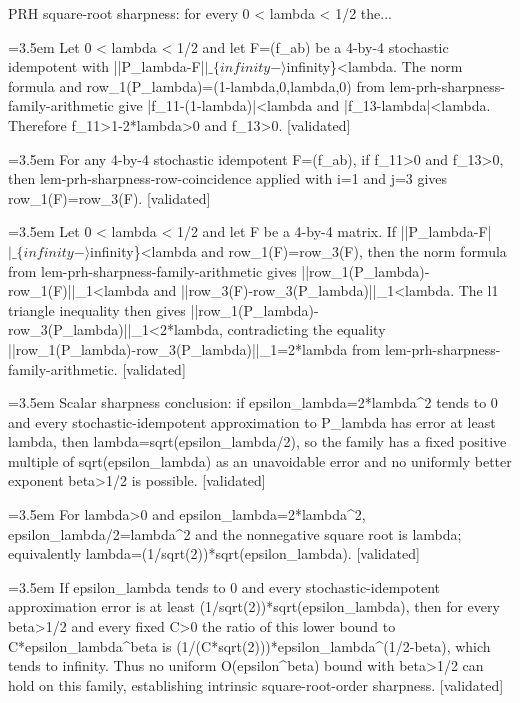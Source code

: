 \documentclass{article}
\newcommand{\step}[1]{\par\noindent\hangindent=3.5em\hangafter=1%
  \makebox[3.5em][l]{\textbf{#1.}}}
\newcommand{\steptag}[1]{\hfill{\small\textsf{[#1]}}}
\begin{document}
\begin{proofbox}{PRH square-root sharpness: for every 0 < lambda < 1/2 the...}
\step{1.2.1} Let 0 < lambda < 1/2 and let F=(f\_ab) be a 4-by-4 stochastic idempotent with ||P\_lambda-F|$|\_\{infinity-\rangle$infinity\}<lambda. The norm formula and row\_1(P\_lambda)=(1-lambda,0,lambda,0) from lem-prh-sharpness-family-arithmetic give |f\_11-(1-lambda)|<lambda and |f\_13-lambda|<lambda. Therefore f\_11>1-2*lambda>0 and f\_13>0. \steptag{validated} \\[4pt]
\step{1.2.2} For any 4-by-4 stochastic idempotent F=(f\_ab), if f\_11>0 and f\_13>0, then lem-prh-sharpness-row-coincidence applied with i=1 and j=3 gives row\_1(F)=row\_3(F). \steptag{validated} \\[4pt]
\step{1.2.3} Let 0 < lambda < 1/2 and let F be a 4-by-4 matrix. If ||P\_lambda-F|$|\_\{infinity-\rangle$infinity\}<lambda and row\_1(F)=row\_3(F), then the norm formula from lem-prh-sharpness-family-arithmetic gives ||row\_1(P\_lambda)-row\_1(F)||\_1<lambda and ||row\_3(F)-row\_3(P\_lambda)||\_1<lambda. The l1 triangle inequality then gives ||row\_1(P\_lambda)-row\_3(P\_lambda)||\_1<2*lambda, contradicting the equality ||row\_1(P\_lambda)-row\_3(P\_lambda)||\_1=2*lambda from lem-prh-sharpness-family-arithmetic. \steptag{validated} \\[4pt]
\step{1.3} Scalar sharpness conclusion: if epsilon\_lambda=2*lambda\textasciicircum{}2 tends to 0 and every stochastic-idempotent approximation to P\_lambda has error at least lambda, then lambda=sqrt(epsilon\_lambda/2), so the family has a fixed positive multiple of sqrt(epsilon\_lambda) as an unavoidable error and no uniformly better exponent beta>1/2 is possible. \steptag{validated} \\[6pt]
\step{1.3.1} For lambda>0 and epsilon\_lambda=2*lambda\textasciicircum{}2, epsilon\_lambda/2=lambda\textasciicircum{}2 and the nonnegative square root is lambda; equivalently lambda=(1/sqrt(2))*sqrt(epsilon\_lambda). \steptag{validated} \\[4pt]
\step{1.3.2} If epsilon\_lambda tends to 0 and every stochastic-idempotent approximation error is at least (1/sqrt(2))*sqrt(epsilon\_lambda), then for every beta>1/2 and every fixed C>0 the ratio of this lower bound to C*epsilon\_lambda\textasciicircum{}beta is (1/(C*sqrt(2)))*epsilon\_lambda\textasciicircum{}(1/2-beta), which tends to infinity. Thus no uniform O(epsilon\textasciicircum{}beta) bound with beta>1/2 can hold on this family, establishing intrinsic square-root-order sharpness. \steptag{validated} \\[4pt]
\end{proofbox}
\end{document}
